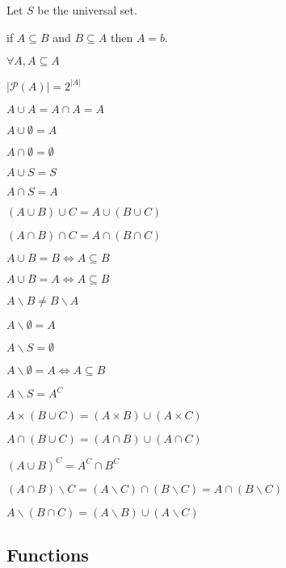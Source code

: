\documentclass[5pt]{article}
\begin{document}
\begin{multicols}{2}
\begin{properties}
    Let $S$ be the universal set.
    \begin{itemize*}
        \item if $A\subseteq B$ and $B\subseteq A$ then  $A=b$.
        \item $\forall A, A\subseteq A$
        \item $|\mathcal{P}(A)|=2^{|A|}$
        \item $A\cup A=A\cap A=A$
        \item $A\cup\emptyset=A$
        \item $A\cap\emptyset=\emptyset$
        \item $A\cup S=S$ 
        \item $A\cap S=A$
        \item $(A\cup B)\cup C=A\cup (B\cup C)$
        \item $(A\cap B)\cap C=A\cap (B\cap C)$
        \item $A\cup B =B\Leftrightarrow A\subseteq B$
        \item $A\cup B =A\Leftrightarrow A\subseteq B$
        \item $A\backslash B \neq B\backslash A$
        \item $A\backslash\emptyset = A$
        \item $A\backslash S=\emptyset$
        \item $A\backslash\emptyset =A\Leftrightarrow A\subseteq B$
        \item $A\backslash S= A^C$
        \item $A\times (B\cup C) = (A\times B)\cup (A\times C)$
        \item $ A\cap (B\cup C)=(A\cap B)\cup(A\cap C)$
        \item $(A\cup B)^C=A^C\cap B^C$
        \item $(A\cap B)\backslash C =(A\backslash C)\cap(B\backslash C)=A\cap(B\backslash C)$
        \item $A\backslash (B\cap C)=(A\backslash B)\cup (A\backslash C)$
    \end{itemize*}
\end{properties}

\subsection{Functions}


\end{multicols}
\end{document}
